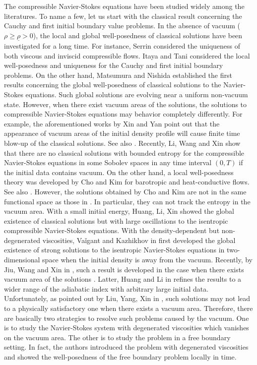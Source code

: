 \documentclass[12pt,a4paper]{amsart}
\numberwithin{equation}{section}
\theoremstyle{plain}
\theoremstyle{definition}
\begin{document}
The compressible Navier-Stokes equations have been studied widely among the literatures. To name a few, let us start with the classical result concerning the Cauchy and first initial boundary value problems. In the absence of vacuum ($ \rho \geq \underline \rho > 0 $), the local and global well-posedness of classical solutions have been investigated for a long time. For instance, Serrin \cite{Serrin1959} considered the uniqueness of both viscous and inviscid compressible flows. Itaya \cite{Itaya1971} and Tani \cite{Tani1977} considered the local well-posedness and uniqueness for the Cauchy and first initial boundary problems. On the other hand, Matsumura and Nishida \cite{Matsumura1980,Matsumura1983} established the first results concerning the global well-posedness of classical solutions to the Navier-Stokes equations. Such global solutions are evolving near a uniform non-vacuum state. However, when there exist vacuum areas of the solutions, the solutions to compressible Navier-Stokes equations may behavior completely differently. For example, the aforementioned works by Xin and Yan \cite{Xin1998,Xin2013} point out that the appearance of vacuum areas of the initial density profile will cause finite time blow-up of the classical solutions. See also \cite{Jiu2015,Cho2006}. Recently, Li, Wang and Xin \cite{Li2017b} show that there are no classical solutions with bounded entropy for the compressible Navier-Stokes equations in some Sobolev spaces in any time interval $ (0,T) $ if the initial data contains vacuum. On the other hand, a local well-posedness theory was developed by Cho and Kim \cite{Cho2006b,Cho2006a} for barotropic and heat-conductive flows. See also \cite{Zhang2007a}. However, the solutions obtained by Cho and Kim are not in the same functional space as those in \cite{Xin1998}. In particular, they can not track the entropy in the vacuum area. With a small initial energy, Huang, Li, Xin \cite{HuangLiXin2012} showed the global existence of classical solutions but with large oscillations to the isentropic compressible Navier-Stokes equations. With the density-dependent but non-degenerated viscosities,  Va\v{i}gant and Kazhikhov in \cite{Vaygant1995} first developed the global existence of strong solutions to the isentropic Navier-Stokes equations in two-dimensional space when the initial density is away from the vacuum. Recently, by Jiu, Wang and Xin in \cite{Jiu2014}, such a result is developed in the case when there exists vacuum area of the solutions . Latter, Huang and Li in \cite{Huang2016} refines the results to a wider range of the adiabatic index with arbitrary large initial data. Unfortunately, as pointed out by Liu, Yang, Xin in \cite{Liu1998a}, such solutions may not lead to a physically satisfactory one when there exists a vacuum area. Therefore, there are basically two strategies to resolve such problems caused by the vacuum. One is to study the Navier-Stokes system with degenerated viscosities which vanishes on the vacuum area. The other is to study the problem in a free boundary setting. In fact, the authors introduced the problem with degenerated viscosities and showed the well-posedness of the free boundary problem locally in time.
\end{document}
